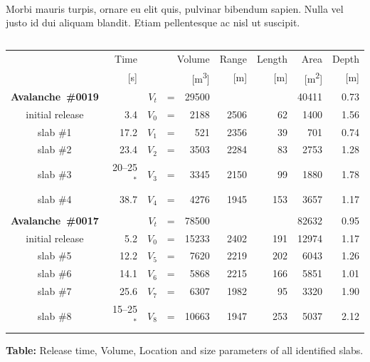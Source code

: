 \documentclass[unknownkeysallowed,usepdftitle=false, parskip=full]{beamer}
\begin{document}
\begin{frame}\label{slabtable}
\begin{columns}
\begin{column}[t]{1.1\textwidth}
\hyperlink{slab}{}\\
Morbi mauris turpis, ornare eu elit quis, pulvinar bibendum sapien. Nulla vel justo id dui aliquam blandit. Etiam pellentesque ac nisl ut suscipit. 



\vspace{0.3cm}
\end{column}
\end{columns}
 \begin{tabular}{c|rr@{}c@{}rrrrr}
 \setlength{\tabcolsep}{6mm}
   & Time & \multicolumn{3}{r}{Volume} & Range & Length & Area & Depth \\
   & [\si{\second}] & \multicolumn{3}{r}{[\si{\cubic\metre}]} & [\si{\metre}] &
[\si{\metre}] & [\si{\square\metre}] & [\si{\metre}]\\\hline

   \textbf{Avalanche~\#0019} & & $V_t$ &=& 29500 & & & 40411 & 0.73 \\
   initial release &3.4& $V_0$ &=& 2188 & 2506 &  62 &  1400 & 1.56 \\
   slab \#1 & 17.2    &  $V_1$ &=&  521 & 2356 &  39 &   701 & 0.74 \\
   slab \#2 & 23.4    &  $V_2$ &=& 3503 & 2284 &  83 &  2753 & 1.28 \\
   slab \#3 & 20--25$^*$ &  $V_3$ &=& 3345 & 2150 &  99 &  1880 & 1.78 \\
   slab \#4 & 38.7    &  $V_4$ &=& 4276 & 1945 & 153 &  3657 & 1.17 \\
   \\
   \textbf{Avalanche~\#0017} & &  $V_t$ &=& 78500 & & & 82632 & 0.95\\
   initial release&5.2&  $V_0$ &=& 15233 & 2402 & 191 & 12974 & 1.17\\
   slab \#5 & 12.2    &  $V_5$ &=&  7620 & 2219 & 202 &  6043 & 1.26 \\
   slab \#6 & 14.1    &  $V_6$ &=&  5868 & 2215 & 166 &  5851 & 1.01 \\
   slab \#7 & 25.6    &  $V_7$ &=&  6307 & 1982 &  95 &  3320 & 1.90 \\
   slab \#8 & 15--25$^*$ &  $V_8$ &=& 10663 & 1947 & 253 &  5037 & 2.12
 \end{tabular}
 
\vspace{0.2cm}
 \textbf{Table:} Release time, Volume, Location and size parameters of all
identified slabs.

\end{frame}
\end{document}
